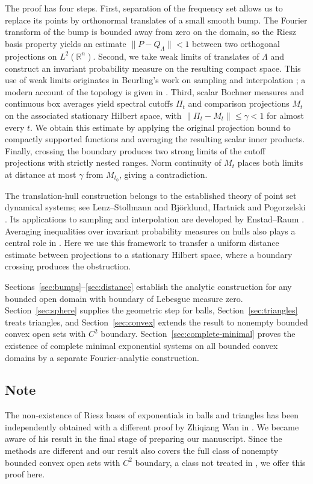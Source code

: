 \documentclass[a4paper,12pt,reqno]{amsart}
\theoremstyle{remark}
\numberwithin{equation}{section}
\newcommand{\R}{\mathbb R}
\begin{document}
The proof has four steps. First, separation of the frequency set allows
us to replace its points by orthonormal translates of a small smooth bump.
The Fourier transform of the bump is bounded away from zero on the domain,
so the Riesz basis property yields an estimate
$\|P-Q_\Lambda\|<1$ between two orthogonal projections on $L^2(\R^n)$.
Second, we take weak limits of translates of $\Lambda$ and construct an
invariant probability measure on the resulting compact space. This use of
weak limits originates in Beurling's work on sampling and interpolation
\cite{Beurling}; a modern account of the topology is given in
\cite[Section~4]{GOR}. Third, scalar Bochner measures and continuous box
averages yield spectral cutoffs $\Pi_t$ and comparison projections $M_t$
on the associated stationary Hilbert space, with
$\|\Pi_t-M_t\|\leq\gamma<1$ for almost every $t$. We obtain this estimate
by applying the original projection bound to compactly supported functions
and averaging the resulting scalar inner products. Finally, crossing the
boundary produces two strong limits of the cutoff projections with
strictly nested ranges. Norm continuity of $M_t$ places both limits at
distance at most $\gamma$ from $M_{t_0}$, giving a contradiction.

The translation-hull construction belongs to the established theory of
point set dynamical systems; see Lenz--Stollmann \cite{LenzStollmann} and
Bj\"orklund, Hartnick and Pogorzelski \cite{BjorklundHartnickPogorzelski}.
Its applications to sampling and interpolation are developed by
Enstad--Raum \cite{EnstadRaum}. Averaging inequalities over invariant
probability measures on hulls also plays a central role in
\cite{EnstadRaum,EnstadVanVelthoven}. Here we use this framework to
transfer a uniform distance estimate between projections to a stationary
Hilbert space, where a boundary crossing produces the obstruction.

Sections~\ref{sec:bumps}--\ref{sec:distance} establish the analytic
construction for any bounded open domain with boundary of Lebesgue measure
zero. Section~\ref{sec:sphere} supplies the geometric step for balls,
Section~\ref{sec:triangles} treats triangles, and Section~\ref{sec:convex}
extends the result to nonempty bounded convex open sets with $C^2$
boundary. Section~\ref{sec:complete-minimal} proves the existence of
complete minimal exponential systems on all bounded convex domains by
a separate Fourier-analytic construction.

\subsection*{Note} The non-existence of Riesz bases of exponentials in
balls and triangles has been independently obtained with a different
proof by Zhiqiang Wan in \cite{Wan}. We became aware of his result in the
final stage of preparing our manuscript. Since the methods are different
and our result also covers the full class of nonempty bounded convex open
sets with $C^2$ boundary, a class not treated in \cite{Wan}, we offer this
proof here.
\end{document}
